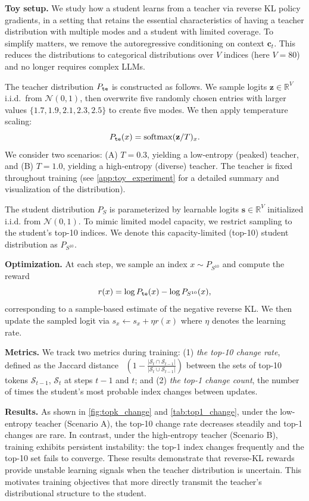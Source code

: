 \textbf{Toy setup.} We study how a student learns from a teacher via reverse KL policy gradients, in a setting that retains the essential characteristics of having a teacher distribution with multiple modes and a student with limited coverage. To simplify matters, we remove the autoregressive conditioning on context $\mathbf{c}_t$. This reduces the distributions to categorical distributions over $V$ indices (here $V = 80$) and no longer requires complex LLMs.

The teacher distribution $P_{\tt te}$ is constructed as follows. We sample logits $\mathbf{z}\in\mathbb{R}^V$ i.i.d.\ from $\mathcal{N}(0,1)$, then overwrite five randomly chosen entries with larger values $\{1.7, 1.9, 2.1, 2.3, 2.5\}$ to create five modes. We then apply temperature scaling: 
\[
P_{\tt te}(x)=\mathrm{softmax}(\mathbf{z}/T)_x.
\]
We consider two scenarios: (A) $T=0.3$, yielding a low-entropy (peaked) teacher, and (B) $T=1.0$, yielding a high-entropy (diverse) teacher. The teacher is fixed throughout training (see \autoref{app:toy_experiment} for a detailed summary and visualization of the distribution).

The student distribution $P_S$ is parameterized by learnable logits $\mathbf{s}\in\mathbb{R}^V$ initialized i.i.d. from $\mathcal{N}(0,1)$. To mimic limited model capacity, we restrict sampling to the student's top-10 indices.
We denote this capacity-limited (top-10) student distribution as $P_{S^{10}}$.

\textbf{Optimization.} At each step, we sample an index $x\sim P_{S^{10}}$ and compute the reward 
\[
r(x) = \log P_{\tt{te}}(x) - \log P_{S^{10}}(x),
\]
corresponding to a sample-based estimate of the negative reverse KL. We then update the sampled logit via $s_x \leftarrow s_x + \eta r(x)$ where $\eta$ denotes the learning rate.

\textbf{Metrics.} We track two metrics during training: (1) {\em the top-10 change rate}, defined as the Jaccard distance~\cite{jaccard1901etude}
$\left(
1 - \frac{|\mathcal{S}_{t} \cap \mathcal{S}_{t-1}|}{|\mathcal{S}_{t} \cup \mathcal{S}_{t-1}|}
\right)$ between the sets of top-10 tokens $\mathcal{S}_{t-1}$, $\mathcal{S}_{t}$ at steps $t-1$ and $t$; and 
(2) {\em the top-1 change count}, the number of times the student's most probable index changes between updates.

\textbf{Results.} As shown in \autoref{fig:topk_change} and \autoref{tab:top1_change}, under the low-entropy teacher (Scenario A), the top-10 change rate decreases steadily and top-1 changes are rare. In contrast, under the high-entropy teacher (Scenario B), training exhibits persistent instability: the top-1 index changes frequently and the top-10 set fails to converge. These results demonstrate that reverse-KL rewards provide unstable learning signals when the teacher distribution is uncertain. This motivates training objectives that more directly transmit the teacher's distributional structure to the student.

